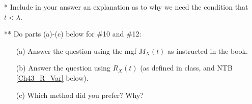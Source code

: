 \documentclass[12pt]{article}
\begin{document}




%








\bigskip

* Include in your answer an explanation as to why we need the condition that $t<\lambda$.

\bigskip

** Do parts (a)-(c) below for \#10 and \#12:
\begin{itemize} 
\item[(a)] Answer the question using the mgf $M_X(t)$ as instructed in the book.
\item[(b)] Answer the question using  $R_X(t)$ (as defined in class, and NTB \ref{Ch43_R_Var} below).
\item[(c)] Which method did you prefer? Why?
\end{itemize} 
\end{document}
